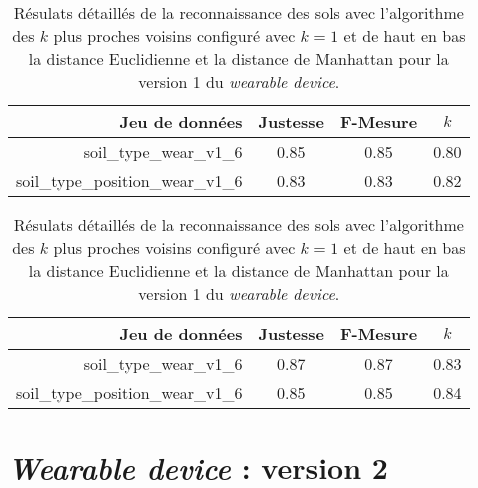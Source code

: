 \begin{table}[H]\renewcommand{\arraystretch}{0.5}
	\centering
	\caption{Résulats détaillés de la reconnaissance des sols avec l'algorithme des $k$ plus proches voisins configuré avec $k=1$ et de haut en bas la distance Euclidienne et la distance de Manhattan pour la version 1 du \textit{wearable device}.}
	\label{tab:knn-wear-v1}
	\begin{tabular}{@{}rccc@{}}
		\toprule
			\textbf{Jeu de données} & \textbf{Justesse} & \textbf{F-Mesure} & \textbf{$k$} \\
		\midrule
			soil\_type\_wear\_v1\_6 & 0.85 & 0.85 & 0.80 \\
			soil\_type\_position\_wear\_v1\_6 & 0.83 & 0.83 & 0.82 \\
	\end{tabular}
	\begin{tabular}{@{}rccc@{}}
		\toprule
			\textbf{Jeu de données} & \textbf{Justesse} & \textbf{F-Mesure} & \textbf{$k$} \\
		\midrule
			soil\_type\_wear\_v1\_6 & 0.87 & 0.87 & 0.83 \\
			soil\_type\_position\_wear\_v1\_6 & 0.85 & 0.85 & 0.84 \\
		\bottomrule
	\end{tabular}
\end{table}

\section{\textit{Wearable device} : version 2}

